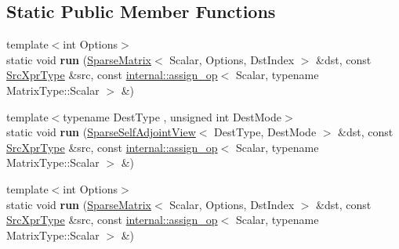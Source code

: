 \subsection*{Static Public Member Functions}
\begin{DoxyCompactItemize}
\item 
\mbox{\label{struct_eigen_1_1internal_1_1_assignment_3_01_dst_xpr_type_00_01_sparse_symmetric_permutation_pro69955201e4d84b32d17d1959c46119e9_a860d6a0c898f8187dab5ca35567082cd}} 
{\footnotesize template$<$int Options$>$ }\\static void {\bfseries run} (\hyperlink{group___sparse_core___module_class_eigen_1_1_sparse_matrix}{Sparse\+Matrix}$<$ Scalar, Options, Dst\+Index $>$ \&dst, const \hyperlink{class_eigen_1_1_sparse_symmetric_permutation_product}{Src\+Xpr\+Type} \&src, const \hyperlink{struct_eigen_1_1internal_1_1assign__op}{internal\+::assign\+\_\+op}$<$ Scalar, typename Matrix\+Type\+::\+Scalar $>$ \&)
\item 
\mbox{\label{struct_eigen_1_1internal_1_1_assignment_3_01_dst_xpr_type_00_01_sparse_symmetric_permutation_pro69955201e4d84b32d17d1959c46119e9_a743214fc5df8550054cff8aaefc5d0db}} 
{\footnotesize template$<$typename Dest\+Type , unsigned int Dest\+Mode$>$ }\\static void {\bfseries run} (\hyperlink{group___sparse_core___module_class_eigen_1_1_sparse_self_adjoint_view}{Sparse\+Self\+Adjoint\+View}$<$ Dest\+Type, Dest\+Mode $>$ \&dst, const \hyperlink{class_eigen_1_1_sparse_symmetric_permutation_product}{Src\+Xpr\+Type} \&src, const \hyperlink{struct_eigen_1_1internal_1_1assign__op}{internal\+::assign\+\_\+op}$<$ Scalar, typename Matrix\+Type\+::\+Scalar $>$ \&)
\item 
\mbox{\label{struct_eigen_1_1internal_1_1_assignment_3_01_dst_xpr_type_00_01_sparse_symmetric_permutation_pro69955201e4d84b32d17d1959c46119e9_a860d6a0c898f8187dab5ca35567082cd}} 
{\footnotesize template$<$int Options$>$ }\\static void {\bfseries run} (\hyperlink{group___sparse_core___module_class_eigen_1_1_sparse_matrix}{Sparse\+Matrix}$<$ Scalar, Options, Dst\+Index $>$ \&dst, const \hyperlink{class_eigen_1_1_sparse_symmetric_permutation_product}{Src\+Xpr\+Type} \&src, const \hyperlink{struct_eigen_1_1internal_1_1assign__op}{internal\+::assign\+\_\+op}$<$ Scalar, typename Matrix\+Type\+::\+Scalar $>$ \&)

\end{DoxyCompactItemize}
